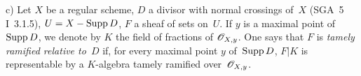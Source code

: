 \begin{remarks}
c) Let $X$ be a regular scheme, $D$ a divisor with normal
crossings of~$X$ (SGA~5 I~3.1.5), $U=X-\operatorname{Supp} D$, $F$ a
sheaf of sets on~$U$. If $y$ is a maximal point of~$\operatorname{Supp}
D$, we denote by $K$ the field of fractions of
$\cal{O}_{X,y}$. One says that $F$ is \emph{tamely
ramified relative to}~$D$
if, for every maximal point $y$ of~$\operatorname{Supp} D$, $F|K$ is
representable by a $K$-algebra tamely
ramified over~$\cal{O}_{X,y}$.
\end{remarks}
